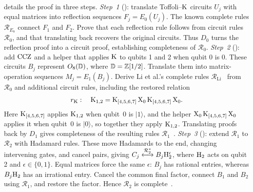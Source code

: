 \documentclass[acmsmall,screen,nonacm]{acmart}
\begin{document}
 details the proof in three steps. \emph{Step~1} (): translate Toffoli--$\mathrm{K}$ circuits $U_j$ with equal matrices into reflection sequences $F_j=E_0(U_j)$. The known complete rules $\mathcal R_{E_8}$ connect $F_1$ and $F_2$. Prove that each reflection rule follows from circuit rules $\mathcal R_0$, and that translating back recovers the original circuits. Thus $D_0$ turns the reflection proof into a circuit proof, establishing completeness of $\mathcal R_0$. \emph{Step~2} (): add $\mathrm{CCZ}$ and a helper that applies $\mathrm{K}$ to qubits 1 and 2 when qubit 0 is $0$. These circuits $B_j$ represent $O_8(\mathbb{D})$, where $\mathbb{D}=\mathbb{Z}[1/2]$. Translate them into matrix-operation sequences $M_j=E_1(B_j)$. Derive Li et al.'s complete rules $\mathcal R_{\mathrm{Li}}$~\cite{li2021on} from $\mathcal R_0$ and additional circuit rules, including the restored relation
\[
r_{\mathrm{K}}:\quad \mathrm{K}_{1,2} = \mathrm{K}_{[4,5,6,7]}\,\mathrm{X}_0\,\mathrm{K}_{[4,5,6,7]}\,\mathrm{X}_0.
\]
Here $\mathrm{K}_{[4,5,6,7]}$ applies $\mathrm{K}_{1,2}$ when qubit~$0$ is $\lvert1\rangle$, and the helper $\mathrm{X}_0\,\mathrm{K}_{[4,5,6,7]}\,\mathrm{X}_0$ applies it when qubit~$0$ is $\lvert0\rangle$, so together they apply $\mathrm{K}_{1,2}$. Translating proofs back by $D_1$ gives completeness of the resulting rules $\mathcal R_1$~\cite[Theorem~5.2, with $r_{\K}$ restored]{amy2024toffoli}. \emph{Step~3} (): extend $\mathcal R_1$ to $\mathcal R_2$ with Hadamard rules. These move Hadamards to the end, changing intervening gates, and cancel pairs, giving $C_j\overset{\mathcal R_2^{*}}{\longleftrightarrow}B_j\mathrm{H}_2^{\epsilon}$, where $\mathrm{H}_2$ acts on qubit 2 and $\epsilon\in\{0,1\}$. Equal matrices force the same $\epsilon$: $B_j$ has rational entries, whereas $B_j\mathrm{H}_2$ has an irrational entry. Cancel the common final factor, connect $B_1$ and $B_2$ using $\mathcal R_1$, and restore the factor. Hence $\mathcal R_2$ is complete~\cite[Theorem~6.3]{amy2024toffoli}.
\end{document}
